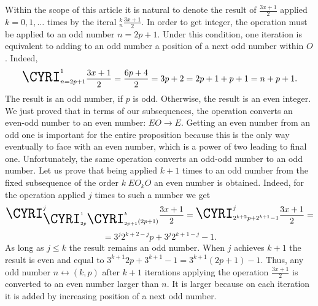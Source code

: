 \documentclass{article}
\begin{document}
Within the scope of this article it is natural to denote the result of $\frac{3x + 1}{2}$ applied $k = 0, 1, \ldots$ times by the iteral \CYRI$_{n}^{k}\frac{3x + 1}{2}$. In order to get integer, the operation must be applied to an odd number $n = 2p + 1$. Under this condition, one iteration is equivalent to adding to an odd number a position of a next odd number within $O$. Indeed,
\begin{displaymath}
\textrm{\LARGE{\CYRI}}_{n = 2p + 1}^{1}\frac{3x + 1}{2} = \frac{6p + 4}{2} = 3p + 2 = 2p + 1 + p + 1 = n + p + 1.
\end{displaymath}
The result is an odd number, if $p$ is odd. Otherwise, the result is an even integer. We just proved that in terms of our subsequences, the operation converts an even-odd number to an even number: $EO \to E$. Getting an even number from an odd one is important for the entire proposition because this is the only way eventually to face with an even number, which is a power of two leading to final one. Unfortunately, the same operation converts an odd-odd number to an odd number. Let us prove that being applied $k + 1$ times to an odd number from the fixed subsequence of the order $k \; EO_k{O}$ an even number is obtained. Indeed, for the operation applied $j$ times to such a number we get
\begin{displaymath}
\textrm{\LARGE{\CYRI}}_{      \textrm{\LARGE{\CYRI}}_{2p}^{1}\textrm{\LARGE{\CYRI}}_{2p+1}^{k}(2p+1)        }^{j}\frac{3x + 1}{2} = \textrm{\LARGE{\CYRI}}_{2^{k + 2}p + 2^{k + 1} - 1}^{j}\frac{3x + 1}{2} = 
\end{displaymath}
\begin{displaymath}
 = 3^{j}2^{k + 2 - j}p + 3^{j}2^{k + 1 - j} - 1.
\end{displaymath}
As long as $j \leq k$ the result remains an odd number. When $j$ achieves $k + 1$ the result is even and equal to $3^{k+1}2p + 3^{k+1} - 1 = 3^{k+1}(2p + 1) - 1$. Thus, any odd number $n \leftrightarrow (k,p)$ after $k + 1$ iterations applying the operation $\frac{3x + 1}{2}$ is converted to an even number larger than $n$. It is larger because on each iteration it is added by increasing position of a next odd number.
\end{document}
